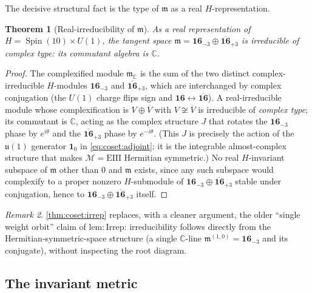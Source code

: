 \documentclass[11pt]{article}
\theoremstyle{plain}
\newtheorem{theorem}{Theorem}[section]
\theoremstyle{definition}
\theoremstyle{remark}
\newtheorem{remark}[theorem]{Remark}
\newcommand{\Spin}{\operatorname{Spin}}
\begin{document}
The decisive structural fact is the type of $\mathfrak m$ as a real
$H$-representation.

\begin{theorem}[Real-irreducibility of $\mathfrak m$]\label{thm:coset:irrep}
As a real representation of $H = \Spin(10)\times U(1)$, the tangent space
$\mathfrak m = \mathbf{16}_{-3}\oplus\overline{\mathbf{16}}_{+3}$ is irreducible
of \emph{complex type}: its commutant algebra is $\mathbb C$.
\end{theorem}

\begin{proof}
The complexified module $\mathfrak m_{\mathbb C}$ is the sum of the two distinct
complex-irreducible $H$-modules $\mathbf{16}_{-3}$ and
$\overline{\mathbf{16}}_{+3}$, which are interchanged by complex conjugation
(the $U(1)$ charge flips sign and $\mathbf{16}\leftrightarrow\overline{\mathbf{16}}$).
A real-irreducible module whose complexification is $V\oplus\overline V$ with
$V\not\cong\overline V$ is irreducible of \emph{complex type}; its commutant is
$\mathbb C$, acting as the complex structure $J$ that rotates the
$\mathbf{16}_{-3}$ phase by $e^{i\theta}$ and the $\overline{\mathbf{16}}_{+3}$
phase by $e^{-i\theta}$. (This $J$ is precisely the action of the $\mathfrak u(1)$
generator $\mathbf 1_{0}$ in \eqref{eq:coset:adjoint}; it is the integrable
almost-complex structure that makes $\mathcal M=\mathrm{EIII}$ Hermitian
symmetric.) No real $H$-invariant subspace of $\mathfrak m$ other than $0$ and
$\mathfrak m$ exists, since any such subspace would complexify to a proper
nonzero $H$-submodule of $\mathbf{16}_{-3}\oplus\overline{\mathbf{16}}_{+3}$
stable under conjugation, hence to $\mathbf{16}_{-3}\oplus\overline{\mathbf{16}}_{+3}$
itself.
\end{proof}

\begin{remark}\label{rem:coset:hermitian}
\autoref{thm:coset:irrep} replaces, with a cleaner argument, the older
``single weight orbit'' claim of $\mathrm{lem}{:}\mathrm{Irrep}$: irreducibility
follows directly from the Hermitian-symmetric-space structure (a single
$\mathbb C$-line $\mathfrak m^{(1,0)} = \mathbf{16}_{-3}$ and its conjugate),
without inspecting the root diagram.
\end{remark}

\subsection{The invariant metric}
\label{sec:coset:metric}
\end{document}
